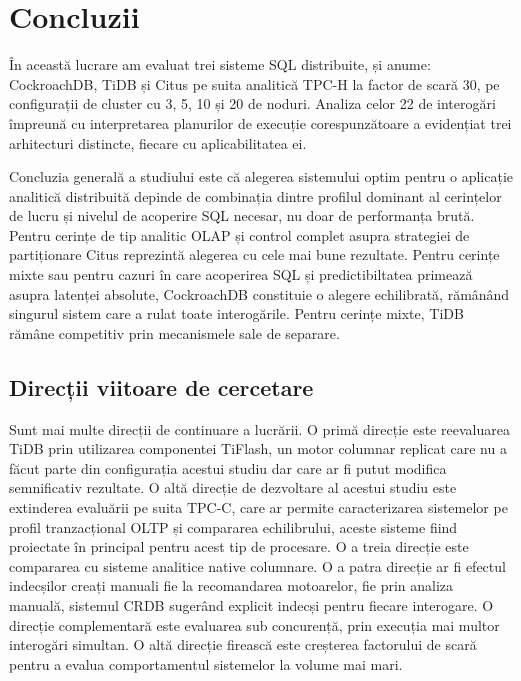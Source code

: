\chapter{Concluzii}

În această lucrare am evaluat trei sisteme SQL distribuite, și anume: CockroachDB, TiDB și Citus pe suita analitică TPC-H la factor de scară 30, pe configurații de cluster cu 3, 5, 10 și 20 de noduri. Analiza celor 22 de interogări împreună cu interpretarea planurilor de execuție corespunzătoare a evidențiat trei arhitecturi distincte, fiecare cu aplicabilitatea ei.

Concluzia generală a studiului este că alegerea sistemului optim pentru o aplicație analitică distribuită depinde de combinația dintre profilul dominant al cerințelor de lucru și nivelul de acoperire SQL necesar, nu doar de performanța brută. Pentru cerințe de tip analitic OLAP și control complet asupra strategiei de partiționare Citus reprezintă alegerea cu cele mai bune rezultate. Pentru cerințe mixte sau pentru cazuri în care acoperirea SQL și predictibiltatea primează asupra latenței absolute, CockroachDB constituie o alegere echilibrată, rămânând singurul sistem care a rulat toate interogările. Pentru cerințe mixte, TiDB rămâne competitiv prin mecanismele sale de separare.

\section{Direcții viitoare de cercetare}

Sunt mai multe direcții de continuare a lucrării. O primă direcție este reevaluarea TiDB prin utilizarea componentei TiFlash, un motor columnar replicat care nu a făcut parte din configurația acestui studiu dar care ar fi putut modifica semnificativ rezultate. O altă direcție de dezvoltare al acestui studiu este extinderea evaluării pe suita TPC-C, care ar permite caracterizarea sistemelor pe profil tranzacțional OLTP și compararea echilibrului, aceste sisteme fiind proiectate în principal pentru acest tip de procesare. O a treia direcție este compararea cu sisteme analitice native columnare. O a patra direcție ar fi efectul indecșilor creați manuali fie la recomandarea motoarelor, fie prin analiza manuală, sistemul CRDB sugerând explicit indecși pentru fiecare interogare. O direcție complementară este evaluarea sub concurență, prin execuția mai multor interogări simultan.  O altă direcție firească este creșterea factorului de scară pentru a evalua comportamentul sistemelor la volume mai mari. 
